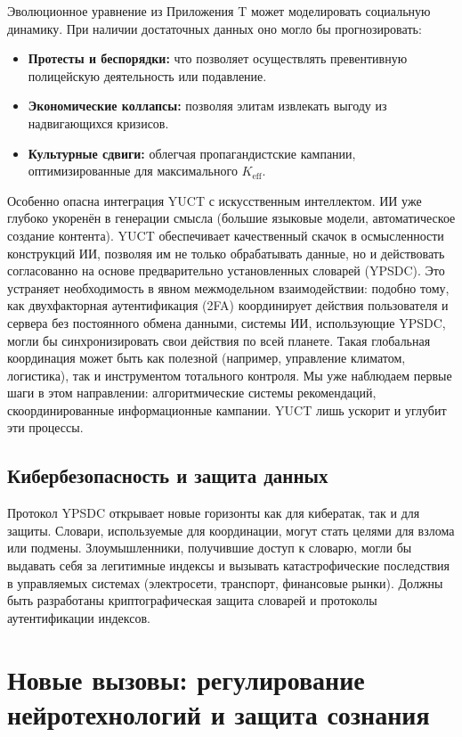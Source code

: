 \documentclass[12pt,a4paper]{article}
\theoremstyle{remark}
\newcommand{\Keff}{K_{\mathrm{eff}}}
\begin{document}
	Эволюционное уравнение из Приложения T может моделировать социальную динамику. При наличии достаточных данных оно могло бы прогнозировать:
	\begin{itemize}[leftmargin=*]
		\item \textbf{Протесты и беспорядки:} что позволяет осуществлять превентивную полицейскую деятельность или подавление.
		\item \textbf{Экономические коллапсы:} позволяя элитам извлекать выгоду из надвигающихся кризисов.
		\item \textbf{Культурные сдвиги:} облегчая пропагандистские кампании, оптимизированные для максимального \(\Keff\).
	\end{itemize}
	
	Особенно опасна интеграция YUCT с искусственным интеллектом. ИИ уже глубоко укоренён в генерации смысла (большие языковые модели, автоматическое создание контента). YUCT обеспечивает качественный скачок в осмысленности конструкций ИИ, позволяя им не только обрабатывать данные, но и действовать согласованно на основе предварительно установленных словарей (YPSDC). Это устраняет необходимость в явном межмодельном взаимодействии: подобно тому, как двухфакторная аутентификация (2FA) координирует действия пользователя и сервера без постоянного обмена данными, системы ИИ, использующие YPSDC, могли бы синхронизировать свои действия по всей планете. Такая глобальная координация может быть как полезной (например, управление климатом, логистика), так и инструментом тотального контроля. Мы уже наблюдаем первые шаги в этом направлении: алгоритмические системы рекомендаций, скоординированные информационные кампании. YUCT лишь ускорит и углубит эти процессы.
	
	\subsection{Кибербезопасность и защита данных}
	\label{subsec:cyber}
	
	Протокол YPSDC открывает новые горизонты как для кибератак, так и для защиты. Словари, используемые для координации, могут стать целями для взлома или подмены. Злоумышленники, получившие доступ к словарю, могли бы выдавать себя за легитимные индексы и вызывать катастрофические последствия в управляемых системах (электросети, транспорт, финансовые рынки). Должны быть разработаны криптографическая защита словарей и протоколы аутентификации индексов.
	
	\section{Новые вызовы: регулирование нейротехнологий и защита сознания}
	\label{sec:neuroethics}
	
\end{document}
